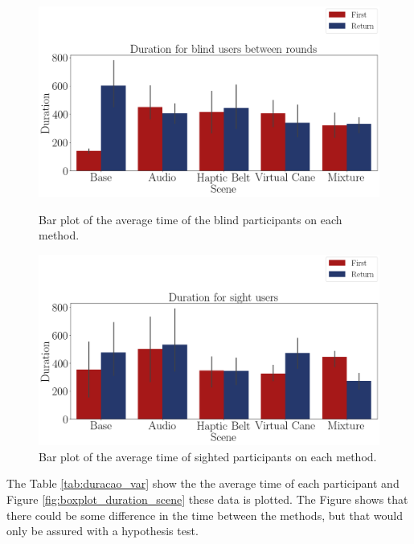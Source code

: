 \begin{figure}[!htb]
    \centering
    \begin{minipage}{\textwidth}
        \centering
        \includegraphics[width = 0.8\linewidth]{Resultados/Tempo/Figuras/png/barplot_duration_scene_blind.png}
        \caption{Bar plot of the average time of the blind participants on each method.}
        \label{fig:barplot_duration_scene_blind}
    \end{minipage}
    \begin{minipage}{\textwidth}
        \centering
        \includegraphics[width = 0.8\linewidth]{Resultados/Tempo/Figuras/png/barplot_duration_scene_sight.png}
        \caption{Bar plot of the average time of sighted participants on each method.}
        \label{fig:barplot_duration_scene_sight}
    \end{minipage}
\end{figure}


The Table \ref{tab:duracao_var} show the the average time of each participant and Figure \ref{fig:boxplot_duration_scene} these data is plotted. The Figure shows that there could be some difference in the time between the methods, but that would only be assured with a hypothesis test. 

